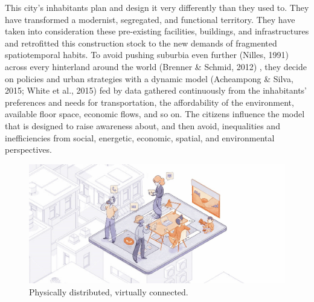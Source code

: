 This city’s inhabitants plan and design it very differently than they used to. They have transformed a modernist, segregated, and functional territory. They have taken into consideration these pre-existing facilities, buildings, and infrastructures and retrofitted this construction stock to the new demands of fragmented spatiotemporal habits. To avoid pushing suburbia even further (Nilles, 1991) \citep{Nilles1991} across every hinterland around the world (Brenner \& Schmid, 2012) \citep{Brenner2012}, they decide on policies and urban strategies with a dynamic model (Acheampong \& Silva, 2015; White et al., 2015) \citep{Acheampong2015, White2015} fed by data gathered continuously from the inhabitants’ preferences and needs for transportation, the affordability of the environment, available floor space, economic flows, and so on. The citizens influence the model that is designed to raise awareness about, and then avoid, inequalities and inefficiencies from social, energetic, economic, spatial, and environmental perspectives.
 

\setcounter{figure}{-1}
\begin{figure}[htbp!]
    \centering
    \includegraphics[width=1\textwidth]{chapters/04_ETRCO2H/figures/fig_04_physically_distributed_virtually_connected_b_r.jpg}
    \captionsetup{format=plain, justification=centering} %
    \caption{Physically distributed, virtually connected.}
   \label{fig:magic_carpet}
\end{figure}
\FloatBarrier

\newpage

